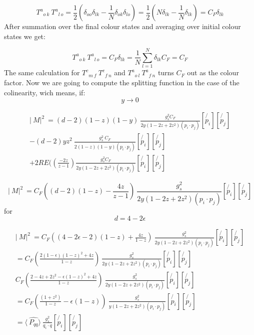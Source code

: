 \begin{equation}
{T^a}_{o\:k} \: {T^a}_{l\:o} = \frac{1}{2}(\delta_{oo}\delta_{lk}-\frac{1}{N}\delta_{ok}\delta_{lo})= \frac{1}{2}(N\delta_{lk}-\frac{1}{N}\delta_{lk})=C_F \delta_{lk}
\end{equation}
After summation over the final colour states and averaging over initial colour states we get:

\begin{equation}
{T^a}_{o\:k} \: {T^a}_{l\:o}=C_F \delta_{lk}=\frac{1}{N} \displaystyle\sum\limits_{l=1}^ N \delta_{lk}C_F=C_F
\end{equation}
The same calculation for $ {T^c}_{m\:f} \: {T^c}_{f\:n} $ and $ {T^a}_{o\:l} \: {T^a}_{f\:n} $ turns $ C_F $ out as the colour factor.
Now we are going to compute the splitting function in the case of the colinearity, wich means, if:
\begin{equation}
y \longrightarrow 0
\end{equation}

\begin{equation}
\begin{split}
\lvert\:M\lvert^2\: = (d-2)(1-z)(1-y)\:\frac{g_s^2 C_F}{2y(1-2z+2z^2)(p_i \cdot p_j)}
[\not{p_i}][\not{p_j}]\\
-(d-2)yz^2\:\frac{g_s^2 \: C_F }{2(1-z)(1-y)(p_i \cdot p_j)}
[\not{p_i}][\not{p_j}]\\
+2RE((\frac{-2z}{z-1}) \frac{g_s^2 C_F}{2y(1-2z+2z^2)(p_i \cdot p_j)} 
[\not{p_i}][\not{p_j}]
\end{split}
\end{equation}

\begin{equation}
\lvert\:M\lvert^2\: = C_F((d-2)(1-z)-\frac{4z}{z-1})\:\frac{g_s^2}{2y(1-2z+2z^2)(p_i \cdot p_j)}[\not{p_i}][\not{p_j}]
\end{equation}
for
\begin{equation}
d=4-2\epsilon
\end{equation}

\begin{equation}
\begin{split}
\lvert\:M\lvert^2\: = C_F((4-2\epsilon-2)(1-z)+\frac{4z}{1-z})\:\frac{g_s^2}{2y(1-2z+2z^2)(p_i \cdot p_j)}[\not{p_i}][\not{p_j}]\\
=C_F(\frac{2(1-\epsilon)(1-z)^2+4z}{1-z})\:\frac{g_s^2}{2y(1-2z+2z^2)(p_i \cdot p_j)}[\not{p_i}][\not{p_j}]\\
C_F(\frac{2-4z+2z^2-\epsilon(1-z)^2+4z}{1-z})\:\frac{g_s^2}{2y(1-2z+2z^2)(p_i \cdot p_j)}[\not{p_i}][\not{p_j}]\\
=C_F(\frac{(1+z^2)}{1-z}-\epsilon(1-z))\:\frac{g_s^2}{y(1-2z+2z^2)(p_i \cdot p_j)}[\not{p_i}][\not{p_j}]\\
=\langle\:\hat{P_{qq}}\rangle\:\frac{g_s^2}{q_i \cdot q}[\not{p_i}][\not{p_j}]\\
\end{split}
\end{equation}

\newpage
